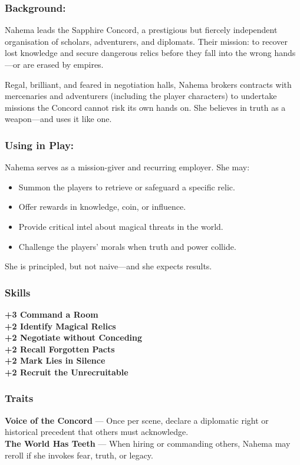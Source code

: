 \begin{paracol}{3}
    \subsubsection*{Background:}
    Nahema leads the Sapphire Concord, a prestigious but fiercely independent organisation of scholars, adventurers, and diplomats. Their mission: to recover lost knowledge and secure dangerous relics before they fall into the wrong hands—or are erased by empires.

    Regal, brilliant, and feared in negotiation halls, Nahema brokers contracts with mercenaries and adventurers (including the player characters) to undertake missions the Concord cannot risk its own hands on. She believes in truth as a weapon—and uses it like one.

    \switchcolumn
    \subsubsection*{Using in Play:}
    Nahema serves as a mission-giver and recurring employer. She may:
    \begin{itemize}
        \item Summon the players to retrieve or safeguard a specific relic.
        \item Offer rewards in knowledge, coin, or influence.
        \item Provide critical intel about magical threats in the world.
        \item Challenge the players' morals when truth and power collide.
    \end{itemize}

    She is principled, but not naive—and she expects results.

    \switchcolumn
    \subsubsection{Skills}
        \noindent\textbf{+3 Command a Room} \\
        \noindent\textbf{+2 Identify Magical Relics} \\
        \noindent\textbf{+2 Negotiate without Conceding} \\
        \noindent\textbf{+2 Recall Forgotten Pacts} \\
        \noindent\textbf{+2 Mark Lies in Silence} \\
        \noindent\textbf{+2 Recruit the Unrecruitable}
    \subsubsection{Traits}
        \textbf{Voice of the Concord} — Once per scene, declare a diplomatic right or historical precedent that others must acknowledge.\\
        \textbf{The World Has Teeth} — When hiring or commanding others, Nahema may reroll if she invokes fear, truth, or legacy.
\end{paracol}

